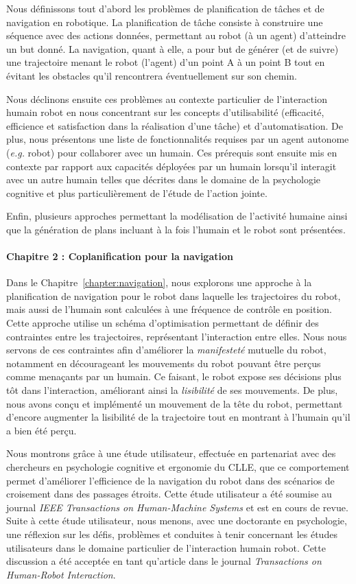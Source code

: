 Nous définissons tout d'abord les problèmes de planification de tâches et de navigation en robotique. La planification de tâche consiste à construire une séquence avec des actions données, permettant au robot (à un agent) d'atteindre un but donné. La navigation, quant à elle, a pour but de générer (et de suivre) une trajectoire menant le robot (l'agent) d'un point A à un point B tout en évitant les obstacles qu'il rencontrera éventuellement sur son chemin.

Nous déclinons ensuite ces problèmes au contexte particulier de l'interaction humain robot en nous concentrant sur les concepts d'utilisabilité (efficacité, efficience et satisfaction dans la réalisation d'une tâche) et d'automatisation. De plus, nous présentons une liste de fonctionnalités requises par un agent autonome (\textit{e.g.} robot) pour collaborer avec un humain. Ces prérequis sont ensuite mis en contexte par rapport aux capacités déployées par un humain lorsqu'il interagit avec un autre humain telles que décrites dans le domaine de la psychologie cognitive et plus particulièrement de l'étude de l'action jointe.

Enfin, plusieurs approches permettant la modélisation de l'activité humaine ainsi que la génération de plans incluant à la fois l'humain et le robot sont présentées.

\paragraph{Chapitre 2 : Coplanification pour la navigation}
Dans le Chapitre~\ref{chapter:navigation}, nous explorons une approche à la planification de navigation pour le robot dans laquelle les trajectoires du robot, mais aussi de l'humain sont calculées à une fréquence de contrôle en position. Cette approche utilise un schéma d'optimisation permettant de définir des contraintes entre les trajectoires, représentant l'interaction entre elles. Nous nous servons de ces contraintes afin d'améliorer la \textit{manifesteté} mutuelle du robot, notamment en décourageant les mouvements du robot pouvant être perçus comme menaçants par un humain. Ce faisant, le robot expose ses décisions plus tôt dans l'interaction, améliorant ainsi la \textit{lisibilité} de ses mouvements. De plus, nous avons conçu et implémenté un mouvement de la tête du robot, permettant d'encore augmenter la lisibilité de la trajectoire tout en montrant à l'humain qu'il a bien été perçu.

Nous montrons grâce à une étude utilisateur, effectuée en partenariat avec des chercheurs en psychologie cognitive et ergonomie du CLLE, que ce comportement permet d'améliorer l’efficience de la navigation du robot dans des scénarios de croisement dans des passages étroits. Cette étude utilisateur a été soumise au journal \textit{IEEE Transactions on Human-Machine Systems} et est en cours de revue. Suite à cette étude utilisateur, nous menons, avec une doctorante en psychologie, une réflexion sur les défis, problèmes et conduites à tenir concernant les études utilisateurs dans le domaine particulier de l'interaction humain robot. Cette discussion a été acceptée en tant qu'article dans le journal \textit{Transactions on Human-Robot Interaction}.

